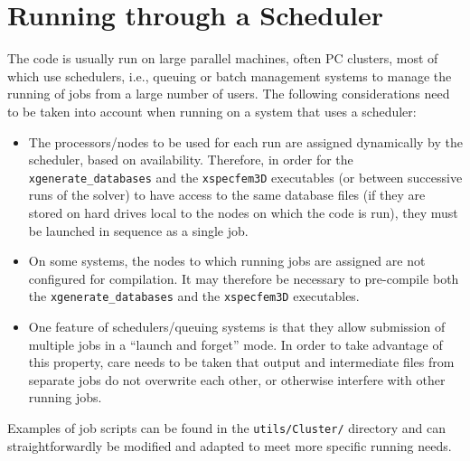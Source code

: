 \chapter{Running through a Scheduler}\label{cha:Scheduler}

The code is usually run on large parallel machines, often PC clusters,
most of which use schedulers, i.e., queuing or batch management systems
to manage the running of jobs from a large number of users. The following
considerations need to be taken into account when running on a system
that uses a scheduler:
\begin{itemize}
\item The processors/nodes to be used for each run are assigned dynamically
by the scheduler, based on availability. Therefore, in order for the
\texttt{xgenerate\_databases} and the \texttt{xspecfem3D} executables
(or between successive runs of the solver) to have access to the same
database files (if they are stored on hard drives local to the nodes
on which the code is run), they must be launched in sequence as a
single job.
\item On some systems, the nodes to which running jobs are assigned are
not configured for compilation. It may therefore be necessary to pre-compile
both the \texttt{xgenerate\_databases} and the \texttt{xspecfem3D}
executables.
\item One feature of schedulers/queuing systems is that they allow submission
of multiple jobs in a ``launch and forget'' mode. In order to take
advantage of this property, care needs to be taken that output and
intermediate files from separate jobs do not overwrite each other,
or otherwise interfere with other running jobs.
\end{itemize}
Examples of job scripts can be found in the \texttt{\small utils/Cluster/}{\small{}
directory and can straightforwardly be modified and adapted to meet
more specific running needs.}{\small \par}

